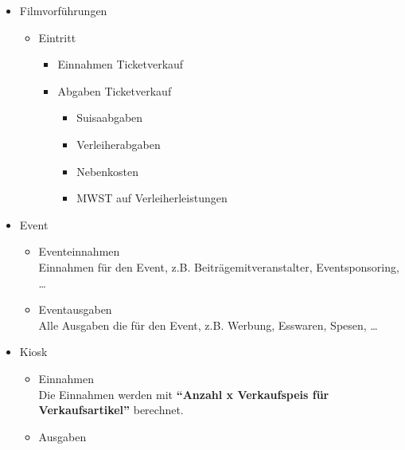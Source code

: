 \documentclass[
]{article}
\providecommand{\tightlist}{%
  \setlength{\itemsep}{0pt}\setlength{\parskip}{0pt}}
\begin{document}
\begin{itemize}
\tightlist
\item
  Filmvorführungen\\

  \begin{itemize}
  \tightlist
  \item
    Eintritt

    \begin{itemize}
    \tightlist
    \item
      Einnahmen Ticketverkauf
    \item
      Abgaben Ticketverkauf

      \begin{itemize}
      \tightlist
      \item
        Suisaabgaben
      \item
        Verleiherabgaben
      \item
        Nebenkosten
      \item
        MWST auf Verleiherleistungen
      \end{itemize}
    \end{itemize}
  \end{itemize}
\item
  Event

  \begin{itemize}
  \tightlist
  \item
    Eventeinnahmen\\
    Einnahmen für den Event, z.B. Beiträgemitveranstalter,
    Eventsponsoring, \ldots{}
  \item
    Eventausgaben\\
    Alle Ausgaben die für den Event, z.B. Werbung, Esswaren, Spesen,
    \ldots{}
  \end{itemize}
\item
  Kiosk

  \begin{itemize}
  \tightlist
  \item
    Einnahmen\\
    Die Einnahmen werden mit \textbf{``Anzahl x Verkaufspeis für
    Verkaufsartikel''} berechnet.
  \item
    Ausgaben


\end{itemize}
\end{itemize}
\end{document}

